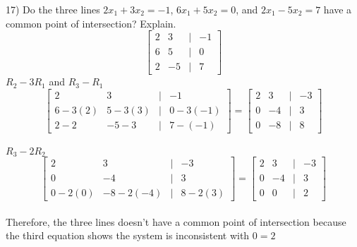 \documentclass[]{article}
\begin{document}
17) Do the three lines $2x_1+3x_2=-1$, $6x_1+5x_2=0$, and $2x_1-5x_2=7$ have a common point of intersection? Explain.\\
\[
\begin{bmatrix}
	2&3&|&-1\\
	6&5&|&0\\
	2&-5&|&7
\end{bmatrix}
\]
$R_2-3R_1$ and $R_3-R_1$
\[
\begin{bmatrix}
	2&3&|&-1\\
	6-3(2)&5-3(3)&|&0-3(-1)\\
	2-2&-5-3&|&7-(-1)
\end{bmatrix}=
\begin{bmatrix}
	2&3&|&-3\\
	0&-4&|&3\\
	0&-8&|&8
\end{bmatrix}
\]\\
$R_3-2R_2$
\[
\begin{bmatrix}
	2&3&|&-3\\
	0&-4&|&3\\
	0-2(0)&-8-2(-4)&|&8-2(3)
\end{bmatrix}=
\begin{bmatrix}
	2&3&|&-3\\
	0&-4&|&3\\
	0&0&|&2
\end{bmatrix}
\]\\
Therefore, the three lines doesn't have a common point of intersection because the third equation shows the system is inconsistent with $0=2$\\
\end{document}
